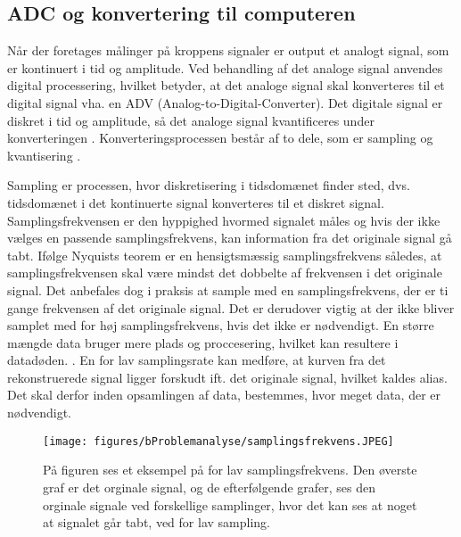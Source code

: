 \subsection{ADC og konvertering til computeren}
Når der foretages målinger på kroppens signaler er output et analogt signal, som er kontinuert i tid og amplitude. Ved behandling af det analoge signal anvendes digital processering, hvilket betyder, at det analoge signal skal konverteres til et digital signal vha. en ADV (Analog-to-Digital-Converter). Det digitale signal er diskret i tid og amplitude, så det analoge signal kvantificeres under konverteringen \cite{Webster2009}. Konverteringsprocessen består af to dele, som er sampling og kvantisering \cite{Zouridakis2003}.  

Sampling er processen, hvor diskretisering i tidsdomænet finder sted, dvs. tidsdomænet i det kontinuerte signal konverteres til et diskret signal. Samplingsfrekvensen er den hyppighed hvormed signalet måles og hvis der ikke vælges en passende samplingsfrekvens, kan information fra det originale signal gå tabt. Ifølge Nyquists teorem er en hensigtsmæssig samplingsfrekvens således, at samplingsfrekvensen skal være mindst det dobbelte af frekvensen i det originale signal. \cite{Zouridakis2003} Det anbefales dog i praksis at sample med en samplingsfrekvens, der er ti gange frekvensen af det originale signal. Det er derudover vigtig at der ikke bliver samplet med for høj samplingsfrekvens, hvis det ikke er nødvendigt. En større mængde data bruger mere plads og proccesering, hvilket kan resultere i datadøden. . En for lav samplingsrate kan medføre, at kurven fra det rekonstruerede signal ligger forskudt ift. det originale signal, hvilket kaldes alias. \cite{Zouridakis2003} Det skal derfor inden opsamlingen af data, bestemmes, hvor meget data, der er nødvendigt.

\begin{figure}[H]
	\centering
	\texttt{[image: figures/bProblemanalyse/samplingsfrekvens.JPEG]}
	\caption{På figuren ses et eksempel på for lav samplingsfrekvens. Den øverste graf er det orginale signal, og de efterfølgende grafer, ses den orginale signale ved forskellige samplinger, hvor det kan ses at noget at signalet går tabt, ved for lav sampling. \cite{konrad2006}}
	\label{samplingsfrekvens}
\end{figure}
 
